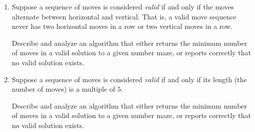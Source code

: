 \documentclass[11pt]{article}
\begin{document}
\begin{enumerate}
\begin{itemize}\itemsep40pt
\item What are the vertices?  What does each vertex represent?
\item What are the edges?  Are they directed or undirected?
\item If the vertices and/or edges have associated values, what are they?
\item \textbf{What is the precise relationship between your graph and the stated problem?}
\item What standard graph algorithm are you using to solve the problem?
\item What is the running time of your entire algorithm, \emph{including} the time to build the graph, \emph{as a function of the original input parameters}?
\end{itemize}



The remaining problems consider variants of problem 2, where the sequence of moves must satisfy certain constraints to be considered a valid solution.  For each problem, your goal is to describe and analyze an algorithm that either returns the minimum number of moves in a \emph{valid} solution to a given number maze, or reports correctly that no valid solution exists.

\item
Suppose a sequence of moves is considered \emph{valid} if and only if the moves  alternate between horizontal and vertical.  That is, a valid move sequence never has two horizontal moves in a row or two vertical moves in a row.

Describe and analyze an algorithm that either returns the minimum number of moves in a valid solution to a given number maze, or reports correctly that no valid solution exists.


\item
Suppose a sequence of moves is considered \emph{valid} if and only if its length (the number of moves) is a multiple of $5$.

Describe and analyze an algorithm that either returns the minimum number of moves in a valid solution to a given number maze, or reports correctly that no valid solution exists.



\end{enumerate}



\end{document}
